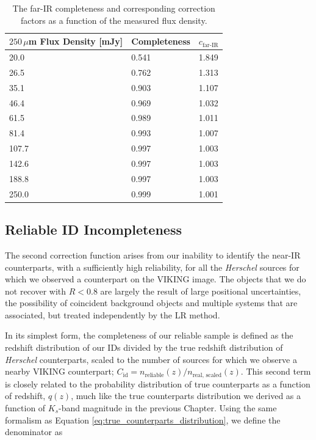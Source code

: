 \begin{table}
    \centering
    \begin{tabular}{p{5cm}|p{2.5cm}|p{2.5cm}}
        \hline
        \hline
        $250\,\mu$m Flux Density [mJy] & Completeness & $c_{\textrm{far-IR}}$ \\
        \hline
        \hline
        20.0 & 0.541 & 1.849 \\
        26.5 & 0.762 & 1.313 \\
        35.1 & 0.903 & 1.107 \\
        46.4 & 0.969 & 1.032 \\
        61.5 & 0.989 & 1.011 \\
        81.4 & 0.993 & 1.007 \\
        107.7 & 0.997 & 1.003 \\
        142.6 & 0.997 & 1.003 \\
        188.8 & 0.997 & 1.003 \\
        250.0 & 0.999 & 1.001 \\
        \hline
    \end{tabular}
    \caption[Far-IR catalogue completeness as a function of measured $250\,\mu$m flux density]{The far-IR completeness and corresponding correction factors as a function of the measured flux density.}
    \label{tab:submm_completeness_table}
\end{table}

\subsection{Reliable ID Incompleteness}

The second correction function arises from our inability to identify the near-IR counterparts, with a sufficiently high reliability, for all the \textit{Herschel} sources for which we observed a counterpart on the VIKING image. The objects that we do not recover with $R < 0.8$ are largely the result of large positional uncertainties, the possibility of coincident background objects and multiple systems that are associated, but treated independently by the LR method. 

In its simplest form, the completeness of our reliable sample is defined as the redshift distribution of our IDs divided by the true redshift distribution of \textit{Herschel} counterparts, scaled to the number of sources for which we observe a nearby VIKING counterpart; $C_{\textrm{id}} = n_{\textrm{reliable}}(z)/n_{\textrm{real, scaled}}(z)$. This second term is closely related to the probability distribution of true counterparts as a function of redshift, $q(z)$, much like the true counterparts distribution we derived as a function of $K_s$-band magnitude in the previous Chapter. Using the same formalism as Equation \ref{eq:true_counterparts_distribution}, we define the denominator as

